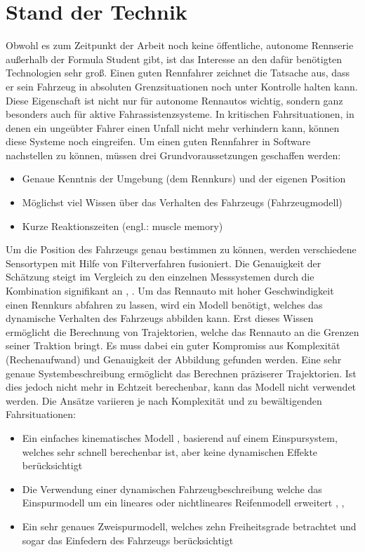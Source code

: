 \documentclass{like}
\begin{document}
\chapter{Stand der Technik}
Obwohl es zum Zeitpunkt der Arbeit noch keine öffentliche, autonome Rennserie außerhalb der Formula Student gibt, ist das Interesse an den dafür benötigten Technologien sehr groß.
Einen guten Rennfahrer zeichnet die Tatsache aus, dass er sein Fahrzeug in absoluten Grenzsituationen noch unter Kontrolle halten kann. Diese Eigenschaft ist nicht nur für autonome Rennautos wichtig, sondern ganz besonders auch für aktive Fahrassistenzsysteme. In kritischen Fahrsituationen, in denen ein ungeübter Fahrer einen Unfall nicht mehr verhindern kann, können diese Systeme noch eingreifen. Um einen guten Rennfahrer in Software nachstellen zu können, müssen drei Grundvoraussetzungen geschaffen werden:
\begin{itemize}
	\item Genaue Kenntnis der Umgebung (dem Rennkurs) und der eigenen Position
	\item Möglichst viel Wissen über das Verhalten des Fahrzeugs (Fahrzeugmodell)
	\item Kurze Reaktionszeiten (engl.: muscle memory)
\end{itemize}

Um die Position des Fahrzeugs genau bestimmen zu können, werden verschiedene Sensortypen mit Hilfe von Filterverfahren fusioniert. Die Genauigkeit der Schätzung steigt im Vergleich zu den einzelnen Messsystemen durch die Kombination signifikant an \cite{GPS_Fusion}, \cite{GPS_IMU_Fusion}. 
Um das Rennauto mit hoher Geschwindigkeit einen Rennkurs abfahren zu lassen, wird ein Modell benötigt, welches das dynamische Verhalten des Fahrzeugs abbilden kann. Erst dieses Wissen ermöglicht die Berechnung von Trajektorien, welche das Rennauto an die Grenzen seiner Traktion bringt. Es muss dabei ein guter Kompromiss aus Komplexität (Rechenaufwand) und Genauigkeit der Abbildung gefunden werden.
Eine sehr genaue Systembeschreibung ermöglicht das Berechnen präziserer Trajektorien. Ist dies jedoch nicht mehr in Echtzeit berechenbar, kann das Modell nicht verwendet werden.
Die Ansätze variieren je nach Komplexität und zu bewältigenden Fahrsituationen:
\begin{itemize}
	\item Ein einfaches kinematisches Modell \cite{MPC_Kinetic}, basierend auf einem Einspursystem, welches sehr schnell berechenbar ist, aber keine dynamischen Effekte berücksichtigt
	\item Die Verwendung einer dynamischen Fahrzeugbeschreibung welche das Einspurmodell um ein lineares oder nichtlineares Reifenmodell erweitert \cite{rc_car_1_43}, \cite{MPC_Dynamic}, \cite{MPC_Dynamic_Tire_Model}
	\item Ein sehr genaues Zweispurmodell, welches zehn Freiheitsgrade betrachtet und sogar das Einfedern des Fahrzeugs berücksichtigt \cite{doi:10.1137/S0036144502414942} \\

\end{itemize}
\end{document}

